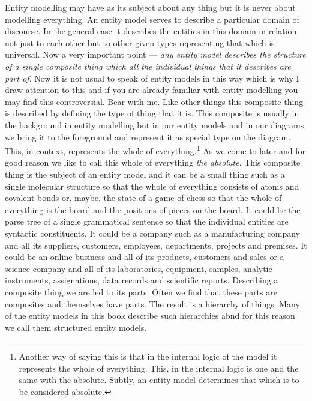 \mynote Entity modelling may have as its subject about any thing but it is never about modelling everything.
An entity model serves to describe a particular domain of discourse. In the general case it describes the entities in this domain in relation not just to each other but to other given types representing that which is universal. 
\mynote
Now a very  important point ---
\textit{any entity model describes the structure of a single composite thing which all the individual things that it describes are part of}. Now it is not usual to speak of entity models in this way which is why I draw attention to this and if you are already familiar with entity modelling you may find this controversial. Bear with me.
\mynote
Like other things this composite thing is described by defining the type of thing that it is. This composite is usually in the background in entity modelling but in our entity models and in our diagrams we bring it to the foreground and represent it as special type on the diagram. 
This, in context, represents the whole of everything.\footnote{Another way of saying this is that in the internal logic of the model it represents the whole of everything. This, in the internal logic is one and the same with the absolute. Subtly, an entity model determines that which is to be considered absolute.} As we come to later and for good reason we like to call this whole of everything \textit{the absolute}.   This composite thing  is the subject of an entity model and it can be a small thing such as a single molecular structure so that the whole of everything consists of atoms and covalent bonds or, maybe, the state of a game of chess so that the whole of everything is the board and the positions of pieces on the board. It could be the parse tree of a single grammatical sentence 
so that the individual entities are syntactic constituents. 
It could be a company such as a manufacturing company and all its suppliers, customers, employees, departments, projects and premises. 
It could be an online business and all of its products, customers and sales or
a science company and all of its laboratories, equipment, samples, analytic instruments, assignations, data records and  scientific reports. 
\mynote
Describing a composite thing we are led to its parts. Often we find that these parts are composites and themselves have parts. The result is a hierarchy of things. Many of the  entity models in this book describe such hierarchies abnd for this reason we call them structured entity models.

